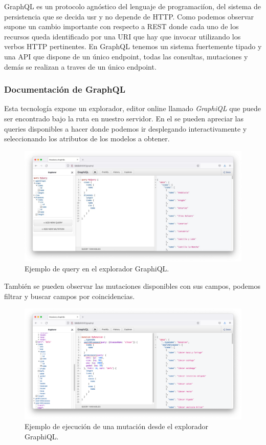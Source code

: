 GraphQL es un protocolo agnóstico del lenguaje de programaciíon, del sistema de
persistencia que se decida usr y no depende de HTTP. Como podemos observar supone un
cambio importante con respecto a REST donde cada uno de los recursos queda identificado
por una URI que hay que invocar utilizando los verbos HTTP pertinentes. En GraphQL tenemos
un sistema fuertemente tipado y una API que dispone de un único endpoint, todas las
consultas, mutaciones y demás se realizan a traves de un único endpoint.

\subsubsection{Documentación de GraphQL}
Esta tecnología expone un explorador, editor online llamado \textit{GraphiQL} que puede
ser encontrado bajo la ruta  en nuestro servidor. En el se pueden
apreciar las queries disponibles a hacer donde podemos ir desplegando interactivamente y
seleccionando los atributos de los modelos a obtener.

\FloatBarrier
\begin{figure}[h]
	\centering	
	\includegraphics[width=\textwidth]{doc/logos/imgs/queries-graph.jpg}
	\caption{ Ejemplo de query en el explorador GraphiQL. }
    \label{fig:graficos-GraphiQL}
\end{figure}
\FloatBarrier

También se pueden observar las mutaciones disponibles con sus campos, podemos filtrar y
buscar campos por coincidencias.

\FloatBarrier
\begin{figure}[h]
	\centering	
	\includegraphics[width=\textwidth]{doc/logos/imgs/mutaciones-graph.png}
	\caption{ Ejemplo de ejecución de una mutación desde el explorador GraphiQL. }
    \label{fig:graficos-GraphiQL}
\end{figure}
\FloatBarrier

